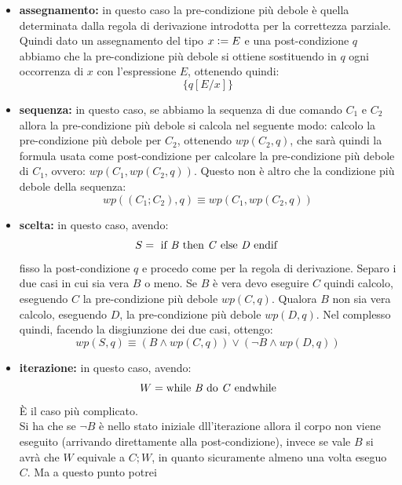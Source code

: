 				      				\begin{itemize}
				      					\item \textbf{assegnamento:} in questo caso la pre-condizione più debole è
				      					      quella determinata dalla regola di derivazione introdotta per la correttezza
				      					      parziale. Quindi dato un assegnamento del tipo $x\cceq E$ e una post-condizione
				      					      $q$ abbiamo che la pre-condizione più debole si ottiene sostituendo in $q$ ogni
				      					      occorrenza di $x$ con l'espressione $E$, ottenendo quindi:
				      					      \[\{q[E/x]\}\]
				      					\item \textbf{sequenza:} in questo caso, se abbiamo la sequenza di due comando
				      					      $C_1$ e $C_2$ allora la pre-condizione più debole si calcola nel seguente modo:
				      					      calcolo la pre-condizione più debole per $C_2$, ottenendo $wp(C_2, q)$, che sarà
				      					      quindi la formula usata come post-condizione per calcolare la pre-condizione più
				      					      debole di $C_1$, ovvero: $wp(C_1, wp(C_2, q))$. Questo non è altro che la
				      					      condizione più debole della sequenza:
				      					      \[wp((C_1;C_2), q)\equiv wp(C_1, wp(C_2, q))\]
				      					\item \textbf{scelta:} in questo caso, avendo:
				      					      \[S=\mbox{ if \textit{B} then \textit{C} else \textit{D} endif }\]
				      					      fisso la post-condizione $q$ e procedo come per la regola di
				      					      derivazione. Separo i due casi in cui sia vera $B$ o meno. Se $B$ è vera devo
				      					      eseguire $C$ quindi calcolo, eseguendo $C$ la pre-condizione più debole
				      					      $wp(C, q)$. Qualora $B$ non sia vera calcolo, eseguendo $D$, la pre-condizione
				      					      più debole $wp(D, q)$. Nel complesso quindi, facendo la disgiunzione dei due
				      					      casi, ottengo: 
				      					      \[wp(S, q)\equiv(B\land wp(C, q))\lor (\neg B\land wp(D, q))\]
				      					\item \textbf{iterazione:} in questo caso, avendo:
				      					      \[W=\mbox{while \textit{B} do \textit{C} endwhile}\]
				      					      È il caso più complicato.\\
				      					      Si ha che se $\neg B$ è nello stato iniziale dll'iterazione allora il corpo
				      					      non viene eseguito (arrivando direttamente alla post-condizione), invece se
				      					      vale $B$ si avrà che $W$ equivale a $C;W$, in 
				      					      quanto sicuramente almeno una volta eseguo $C$. Ma a questo punto potrei

\end{itemize}
